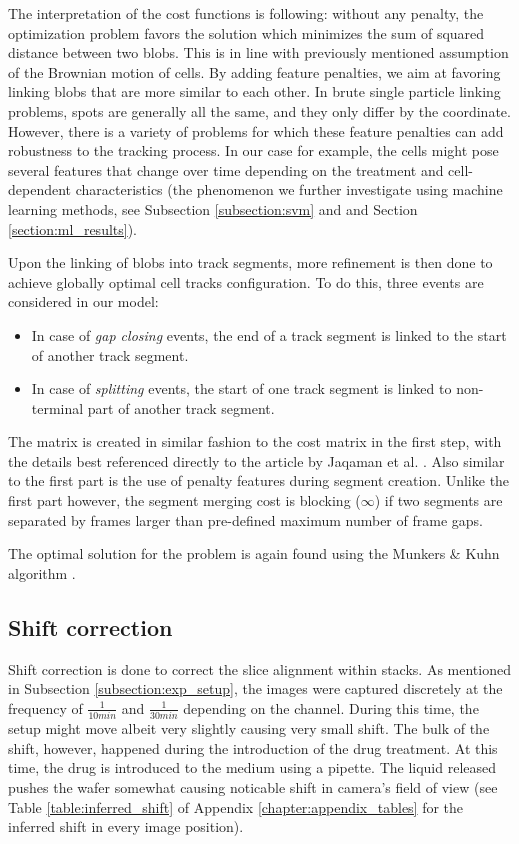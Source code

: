\documentclass[pdftex,12pt,a4paper]{report}
\begin{document}
The interpretation of the cost functions is following: without any penalty, the optimization problem favors the solution which minimizes the sum of squared distance between two blobs. This is in line with previously mentioned assumption of the Brownian motion of cells. By adding feature penalties, we aim at favoring linking blobs that are more similar to each other. In brute single particle linking problems, spots are generally all the same, and they only differ by the coordinate. However, there is a variety of problems for which these feature penalties can add robustness to the tracking process. In our case for example, the cells might pose several features that change over time depending on the treatment and cell-dependent characteristics (the phenomenon we further investigate using machine learning methods, see Subsection \ref{subsection:svm} and and Section \ref{section:ml_results}).

Upon the linking of blobs into track segments, more refinement is then done to achieve globally optimal cell tracks configuration. To do this, three events are considered in our model:

\begin{itemize}
\item In case of \textit{gap closing} events, the end of a track segment is linked to the start of another track segment.
\item In case of \textit{splitting} events, the start of one track segment is linked to non-terminal part of another track segment.
\end{itemize}

The matrix is created in similar fashion to the cost matrix in the first step, with the details best referenced directly to the article by Jaqaman et al. \cite{jaqaman2008robust}. Also similar to the first part is the use of penalty features during segment creation. Unlike the first part however, the segment merging cost is blocking ($\infty$) if two segments are separated by frames larger than pre-defined maximum number of frame gaps.

The optimal solution for the problem is again found using the Munkers \& Kuhn algorithm \cite{munkres1957algorithms}.

\subsection{Shift correction}
\label{subsection:shift_correction}

Shift correction is done to correct the slice alignment within stacks. As mentioned in Subsection \ref{subsection:exp_setup}, the images were captured discretely at the frequency of $\frac{1}{10 min}$ and $\frac{1}{30 min}$ depending on the channel. During this time, the setup might move albeit very slightly causing very small shift. The bulk of the shift, however, happened during the introduction of the  drug treatment. At this time, the drug is introduced to the medium using a pipette. The liquid released pushes the wafer somewhat causing noticable shift in camera's field of view (see Table \ref{table:inferred_shift} of Appendix \ref{chapter:appendix_tables} for the inferred shift in every image position).
\end{document}
